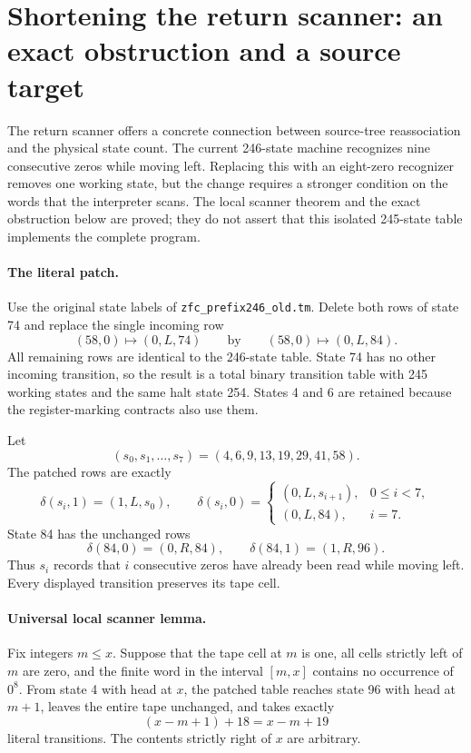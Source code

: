 \section{Shortening the return scanner: an exact obstruction and a source target}
\label{sec:scanner-eight}

The return scanner offers a concrete connection between source-tree
reassociation and the physical state count.  The current 246-state
machine recognizes nine consecutive zeros while moving left.  Replacing
this with an eight-zero recognizer removes one working state, but the
change requires a stronger condition on the words that the interpreter
scans.  The local scanner theorem and the exact obstruction below are
proved; they do not assert that this isolated 245-state table implements
the complete program.

\paragraph{The literal patch.}
Use the original state labels of
\texttt{zfc\_prefix246\_old.tm}.  Delete both rows of state 74 and replace
the single incoming row
\[
 (58,0)\longmapsto(0,L,74)
 \qquad\text{by}\qquad
 (58,0)\longmapsto(0,L,84).
\]
All remaining rows are identical to the 246-state table.  State 74 has no
other incoming transition, so the result is a total binary transition
table with 245 working states and the same halt state 254.  States 4 and
6 are retained because the register-marking contracts also use them.

Let
\[
 (s_0,s_1,\ldots,s_7)=(4,6,9,13,19,29,41,58).
\]
The patched rows are exactly
\[
 \delta(s_i,1)=(1,L,s_0),\qquad
 \delta(s_i,0)=
 \begin{cases}
  (0,L,s_{i+1}),&0\leq i<7,\\
  (0,L,84),&i=7.
 \end{cases}
\]
State 84 has the unchanged rows
\[
 \delta(84,0)=(0,R,84),\qquad
 \delta(84,1)=(1,R,96).
\]
Thus $s_i$ records that $i$ consecutive zeros have already been read
while moving left.  Every displayed transition preserves its tape cell.

\paragraph{Universal local scanner lemma.}
Fix integers $m\leq x$.  Suppose that the tape cell at $m$ is one, all
cells strictly left of $m$ are zero, and the finite word in the interval
$[m,x]$ contains no occurrence of $0^8$.  From state 4 with head at $x$,
the patched table reaches state 96 with head at $m+1$, leaves the entire
tape unchanged, and takes exactly
\[
 (x-m+1)+18=x-m+19
\]
literal transitions.  The contents strictly right of $x$ are arbitrary.

